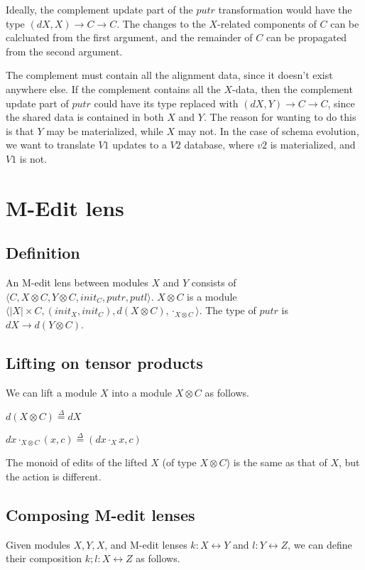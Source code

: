\documentclass[a4paper,10pt]{article}
\newcommand{\defeq}{\ensuremath{\stackrel{\Delta}{=}}}
\begin{document}
Ideally, the complement update part of the $putr$ transformation would have the type $(dX, X) \to C \to C$. The changes to the $X$-related components of $C$ can be calcluated from the first argument, and the remainder of $C$ can be propagated from the second argument. 

The complement must contain all the alignment data, since it doesn't exist anywhere else. If the complement contains all the $X$-data, then the complement update part of $putr$ could have its type replaced with $(dX, Y) \to C \to C$, since the shared data is contained in both $X$ and $Y$. The reason for wanting to do this is that $Y$ may be materialized, while $X$ may not. 
In the case of schema evolution, we want to translate $V1$ updates to a $V2$ database, where $v2$ is materialized, and $V1$ is not.

\section{M-Edit lens}

\subsection{Definition}
An M-edit lens between modules $X$ and $Y$ consists of $\langle C, X \otimes C, Y \otimes C, init_C, putr, putl \rangle$. $X \otimes C$ is a module $\langle |X| \times C, (init_X, init_C), d(X \otimes C), \cdot_{X \otimes C} \rangle$. The type of $putr$ is $dX \to d(Y \otimes C)$.

\subsection{Lifting on tensor products}
We can lift a module $X$ into a module $X \otimes C$ as follows. 

$ d(X \otimes C) \defeq dX$

$ dx \cdot_{X \otimes C} (x,c) \defeq (dx \cdot_X x, c) $

The monoid of edits of the lifted $X$ (of type $X \otimes C$) is the same as that of $X$, but the action is different.

\subsection{Composing M-edit lenses}
Given modules $X, Y, X$, and M-edit lenses $k : X \leftrightarrow Y$ and $l : Y \leftrightarrow Z$, we can define their composition $k;l : X \leftrightarrow Z$ as follows.
\end{document}
